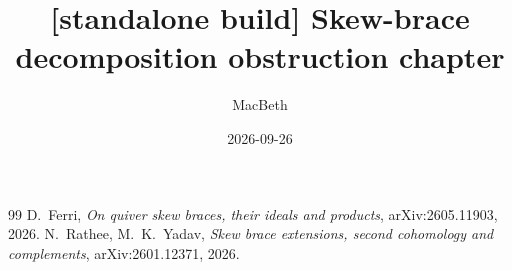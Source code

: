 \documentclass[11pt]{report}
\title{[standalone build] Skew-brace decomposition obstruction chapter}
\author{MacBeth}
\date{2026-09-26}
\theoremstyle{plain}
\theoremstyle{definition}
\theoremstyle{remark}
\begin{document}
\maketitle
\tableofcontents


\begin{thebibliography}{99}
 D.~Ferri, \emph{On quiver skew braces, their ideals and products}, arXiv:2605.11903, 2026.
 N.~Rathee, M.~K.~Yadav, \emph{Skew brace extensions, second cohomology and complements}, arXiv:2601.12371, 2026.
\end{thebibliography}
\end{document}

